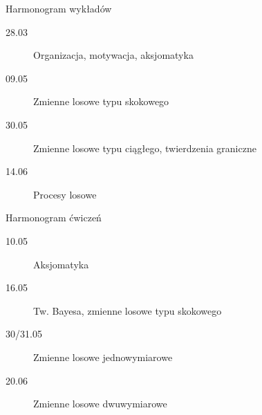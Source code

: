 \documentclass{mp}
\begin{document}
\begin{frame}{Harmonogram wykładów}
\begin{description}
\item[28.03] Organizacja, motywacja, aksjomatyka
\item[09.05] Zmienne losowe typu skokowego
\item[30.05] Zmienne losowe typu ciągłego, twierdzenia graniczne
\item[14.06] Procesy losowe
\end{description}
\end{frame}
\begin{frame}{Harmonogram ćwiczeń}
\begin{description}
\item[10.05] Aksjomatyka
\item[16.05] Tw. Bayesa, zmienne losowe typu skokowego
\item[30/31.05] Zmienne losowe jednowymiarowe
\item[20.06] Zmienne losowe dwuwymiarowe
\end{description}
\end{frame}
\end{document}

